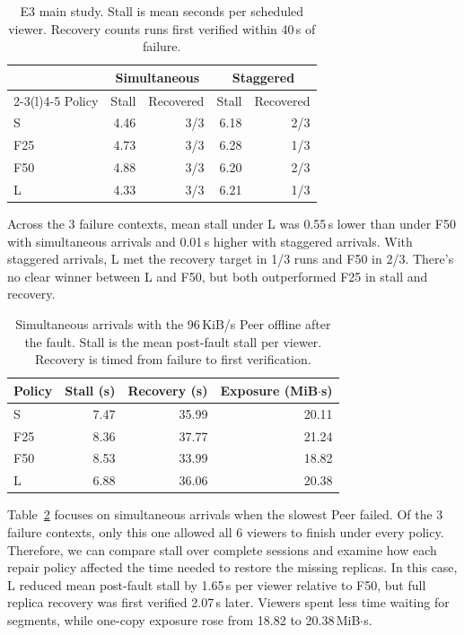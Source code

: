 \begin{table}[ht]
\centering\small
\caption{E3 main study. Stall is mean seconds per scheduled viewer.
Recovery counts runs first verified within 40\,s of failure.}
\label{tab:e3}
\begin{tabular}{@{}l rr rr@{}}
\toprule
 & \multicolumn{2}{c}{Simultaneous} & \multicolumn{2}{c}{Staggered} \\
\cmidrule(lr){2-3}\cmidrule(l){4-5}
Policy & Stall & Recovered & Stall & Recovered \\
\midrule
S   & 4.46 & 3/3 & 6.18 & 2/3 \\
F25 & 4.73 & 3/3 & 6.28 & 1/3 \\
F50 & 4.88 & 3/3 & 6.20 & 2/3 \\
L   & 4.33 & 3/3 & 6.21 & 1/3 \\
\bottomrule
\end{tabular}
\end{table}

Across the 3 failure contexts, mean stall under L was 0.55\,s lower
than under F50 with simultaneous arrivals and 0.01\,s higher with
staggered arrivals. With staggered arrivals, L met the recovery target
in 1/3 runs and F50 in 2/3. 
There's no clear winner between L and F50, but both outperformed F25 in
stall and recovery. 

\begin{table}[ht]
\centering\small
\caption{Simultaneous arrivals with the 96\,KiB/s Peer offline after
the fault. Stall is the mean post-fault stall per viewer. Recovery is timed from failure to first verification.}
\label{tab:e3-slowest}
\begin{tabular}{@{}lrrr@{}}
\toprule
Policy & Stall (s) & Recovery (s) & Exposure (MiB$\cdot$s) \\
\midrule
S & 7.47 & 35.99 & 20.11 \\
F25 & 8.36 & 37.77 & 21.24 \\
F50 & 8.53 & 33.99 & 18.82 \\
L & 6.88 & 36.06 & 20.38 \\
\bottomrule
\end{tabular}
\end{table}

Table~\ref{tab:e3-slowest} focuses on simultaneous arrivals when the slowest Peer failed.
Of the 3 failure contexts, only this one allowed all 6 viewers to finish under every policy.
Therefore, we can compare stall over complete sessions and examine how each repair policy
affected the time needed to restore the missing replicas.
In this case, L reduced mean post-fault stall by
1.65\,s per viewer relative to F50, but full replica recovery was first
verified 2.07\,s later. Viewers spent less time waiting for segments,
while one-copy exposure rose from 18.82 to 20.38\,MiB$\cdot$s.

